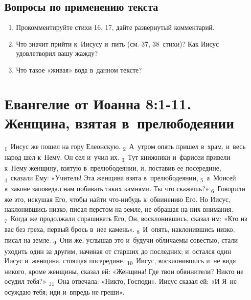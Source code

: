 \documentclass[a4paper,12pt]{article}
\begin{document}
\subsection*{Вопросы по применению текста} 
\begin{enumerate}
    \item Прокомментируйте стихи 16, 17, дайте развернутый комментарий.
    
    \myline
    
    \myline
    \item Что значит прийти к~Иисусу и~пить (см. 37, 38~стихи)? Как Иисус удовлетворил вашу жажду? 
    
    \myline
    
    \myline
    \item Что такое «живая» вода в~данном тексте? 
    
    \myline
    
    \myline
\end{enumerate}


\section{Евангелие от Иоанна 8:1-11. Женщина, взятая в~прелюбодеянии}

\textsubscript{1}~Иисус же пошел на гору Елеонскую. \textsubscript{2}~А~утром опять пришел в~храм, и~весь народ шел к~Нему. Он сел и~учил их. \textsubscript{3}~Тут книжники и~фарисеи привели к~Нему женщину, взятую в~прелюбодеянии, и, поставив ее посередине, \textsubscript{4}~сказали Ему: «Учитель! Эта женщина взята в~прелюбодеянии, \textsubscript{5}~а~Моисей в~законе заповедал нам побивать таких камнями. Ты что скажешь?» \textsubscript{6}~Говорили же это, искушая Его, чтобы найти что-нибудь к~обвинению Его. Но Иисус, наклонившись низко, писал перстом на земле, не обращая на них внимания. \textsubscript{7}~Когда же продолжали спрашивать Его, Он, восклонившись, сказал им: «Кто из вас без греха, первый брось в~нее камень». \textsubscript{8}~И~опять, наклонившись низко, писал на земле. \textsubscript{9}~Они же, услышав это и~будучи обличаемы совестью, стали уходить один за другим, начиная от старших до последних; и~остался один Иисус и~женщина, стоящая посередине. \textsubscript{10}~Иисус, восклонившись и~не видя никого, кроме женщины, сказал ей: «Женщина! Где твои обвинители? Никто не осудил тебя?» \textsubscript{11}~Она отвечала: «Никто, Господи». Иисус сказал ей: «И Я~не осуждаю тебя; иди и~впредь не греши». 
\end{document}
